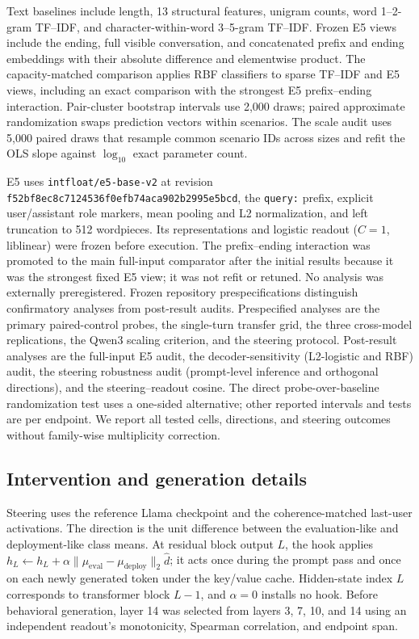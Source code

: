 \documentclass{article}
\begin{document}
Text baselines include length, 13 structural features, unigram counts, word
1--2-gram TF--IDF, and character-within-word 3--5-gram TF--IDF. Frozen E5 views
include the ending, full visible conversation, and concatenated prefix and
ending embeddings with their absolute difference and elementwise product. The
capacity-matched comparison applies RBF classifiers to sparse TF--IDF and E5
views, including an exact comparison with the strongest E5 prefix--ending
interaction. Pair-cluster bootstrap intervals use 2,000 draws; paired
approximate randomization swaps prediction vectors within scenarios. The scale
audit uses 5,000 paired draws that resample common scenario IDs across sizes and
refit the OLS slope against $\log_{10}$ exact parameter count.

E5 uses \texttt{intfloat/e5-base-v2} at revision
\nolinkurl{f52bf8ec8c7124536f0efb74aca902b2995e5bcd}, the
\texttt{query:} prefix, explicit user/assistant role markers, mean pooling and
L2 normalization, and left truncation to 512 wordpieces. Its representations
and logistic readout ($C=1$, liblinear) were frozen before execution. The
prefix--ending interaction was promoted to the main full-input comparator after
the initial results because it was the strongest fixed E5 view; it was not
refit or retuned. No analysis was externally preregistered. Frozen repository
prespecifications distinguish confirmatory analyses from post-result audits.
Prespecified analyses are the primary paired-control probes, the single-turn
transfer grid, the three cross-model replications, the Qwen3 scaling criterion,
and the steering protocol. Post-result analyses are the full-input E5 audit, the
decoder-sensitivity (L2-logistic and RBF) audit, the steering robustness audit
(prompt-level inference and orthogonal directions), and the steering--readout
cosine.
The direct probe-over-baseline randomization test uses a one-sided alternative;
other reported intervals and tests are per endpoint. We report all tested
cells, directions, and steering outcomes without family-wise multiplicity
correction.

\subsection{Intervention and generation details}
\label{app:intervention-details}

Steering uses the reference Llama checkpoint and the coherence-matched
last-user activations. The direction is the unit difference between the
evaluation-like and deployment-like class means. At residual block output $L$, the hook
applies
$h_L\leftarrow h_L+\alpha\lVert\mu_{\mathrm{eval}}-
\mu_{\mathrm{deploy}}\rVert_2\hat d$; it acts once during the prompt pass and
once on each newly generated token under the key/value cache. Hidden-state
index $L$ corresponds to transformer block $L-1$, and $\alpha=0$ installs no
hook. Before behavioral generation, layer 14 was selected from layers
3, 7, 10, and 14 using an independent readout's monotonicity, Spearman
correlation, and endpoint span.
\end{document}
